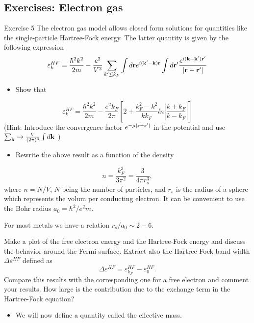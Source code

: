 \documentclass[%
twoside,                 %
final,                   %
10pt]{article}
\begin{document}
\subsection{Exercises: Electron gas}
\begin{block}{Exercise 5 }
The electron gas model allows closed form solutions for quantities like the 
single-particle Hartree-Fock energy.  The latter quantity is given by the following expression
\[
\varepsilon_{k}^{HF}=\frac{\hbar^{2}k^{2}}{2m}-\frac{e^{2}}
{V^{2}}\sum_{k'\leq
k_{F}}\int d{\bf r}e^{i({\bf k'}-{\bf k}){\bf r}}\int
d{\bf r}'\frac{e^{i({\bf k}-{\bf k'}){\bf r}'}}
{\vert{\bf r}-{\bf r'}\vert}
\]
\begin{itemize}
 \item Show that
\end{itemize}

\noindent
\[
\varepsilon_{k}^{HF}=\frac{\hbar^{2}k^{2}}{2m}-\frac{e^{2}
k_{F}}{2\pi}
\left[
2+\frac{k_{F}^{2}-k^{2}}{kk_{F}}ln\left\vert\frac{k+k_{F}}
{k-k_{F}}\right\vert
\right]
\]
(Hint: Introduce the convergence factor 
$e^{-\mu\vert{\bf r}-{\bf r}'\vert}$
in the potential and use  $\sum_{{\bf k}}\rightarrow
\frac{V}{(2\pi)^{3}}\int d{\bf k}$ )
\begin{itemize}
 \item Rewrite the above result as a function of the density
\end{itemize}

\noindent
\[
n= \frac{k_F^3}{3\pi^2}=\frac{3}{4\pi r_s^3},
\]
where $n=N/V$, $N$ being the number of particles, and $r_s$ is the radius of a sphere which represents the volum per conducting electron.  
It can be convenient to use the Bohr radius $a_0=\hbar^2/e^2m$.

For most metals we have a relation $r_s/a_0\sim 2-6$.

Make a plot of the free electron energy and the Hartree-Fock energy and discuss the behavior around the Fermi surface. Extract also   the Hartree-Fock band width $\Delta\varepsilon^{HF}$ defined as
\[ 
\Delta\varepsilon^{HF}=\varepsilon_{k_{F}}^{HF}-
\varepsilon_{0}^{HF}.
\]
Compare this results with the corresponding one for a free electron and comment your results. How large is the contribution due to the exchange term in the Hartree-Fock equation?\newline
\begin{itemize}
 \item We will now define a quantity called the effective mass.
\end{itemize}


\end{block}
\end{document}
